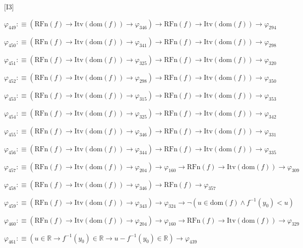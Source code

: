 \begin{fullproof}{[I3]}
\begin{abbrevlist}
\item $\varphi_{449} :\equiv (\mathrm{RFn}(f) \to \mathrm{Itv}(\mathrm{dom}(f)) \to \varphi_{346}) \to \mathrm{RFn}(f) \to \mathrm{Itv}(\mathrm{dom}(f)) \to \varphi_{294}$
\item $\varphi_{450} :\equiv (\mathrm{RFn}(f) \to \mathrm{Itv}(\mathrm{dom}(f)) \to \varphi_{341}) \to \mathrm{RFn}(f) \to \mathrm{Itv}(\mathrm{dom}(f)) \to \varphi_{298}$
\item $\varphi_{451} :\equiv (\mathrm{RFn}(f) \to \mathrm{Itv}(\mathrm{dom}(f)) \to \varphi_{325}) \to \mathrm{RFn}(f) \to \mathrm{Itv}(\mathrm{dom}(f)) \to \varphi_{320}$
\item $\varphi_{452} :\equiv (\mathrm{RFn}(f) \to \mathrm{Itv}(\mathrm{dom}(f)) \to \varphi_{298}) \to \mathrm{RFn}(f) \to \mathrm{Itv}(\mathrm{dom}(f)) \to \varphi_{350}$
\item $\varphi_{453} :\equiv (\mathrm{RFn}(f) \to \mathrm{Itv}(\mathrm{dom}(f)) \to \varphi_{315}) \to \mathrm{RFn}(f) \to \mathrm{Itv}(\mathrm{dom}(f)) \to \varphi_{353}$
\item $\varphi_{454} :\equiv (\mathrm{RFn}(f) \to \mathrm{Itv}(\mathrm{dom}(f)) \to \varphi_{325}) \to \mathrm{RFn}(f) \to \mathrm{Itv}(\mathrm{dom}(f)) \to \varphi_{342}$
\item $\varphi_{455} :\equiv (\mathrm{RFn}(f) \to \mathrm{Itv}(\mathrm{dom}(f)) \to \varphi_{346}) \to \mathrm{RFn}(f) \to \mathrm{Itv}(\mathrm{dom}(f)) \to \varphi_{331}$
\item $\varphi_{456} :\equiv (\mathrm{RFn}(f) \to \mathrm{Itv}(\mathrm{dom}(f)) \to \varphi_{344}) \to \mathrm{RFn}(f) \to \mathrm{Itv}(\mathrm{dom}(f)) \to \varphi_{335}$
\item $\varphi_{457} :\equiv (\mathrm{RFn}(f) \to \mathrm{Itv}(\mathrm{dom}(f)) \to \varphi_{204}) \to \varphi_{160} \to \mathrm{RFn}(f) \to \mathrm{Itv}(\mathrm{dom}(f)) \to \varphi_{309}$
\item $\varphi_{458} :\equiv (\mathrm{RFn}(f) \to \mathrm{Itv}(\mathrm{dom}(f)) \to \varphi_{346}) \to \mathrm{RFn}(f) \to \varphi_{357}$
\item $\varphi_{459} :\equiv (\mathrm{RFn}(f) \to \mathrm{Itv}(\mathrm{dom}(f)) \to \varphi_{343}) \to \varphi_{324} \to \neg (u \in \mathrm{dom}(f) \land f^{-1}(y_{0}) < u)$
\item $\varphi_{460} :\equiv (\mathrm{RFn}(f) \to \mathrm{Itv}(\mathrm{dom}(f)) \to \varphi_{204}) \to \varphi_{160} \to \mathrm{RFn}(f) \to \mathrm{Itv}(\mathrm{dom}(f)) \to \varphi_{329}$
\item $\varphi_{461} :\equiv (u \in \mathbb{R} \to f^{-1}(y_{0}) \in \mathbb{R} \to u - f^{-1}(y_{0}) \in \mathbb{R}) \to \varphi_{439}$

\end{abbrevlist}
\end{fullproof}
